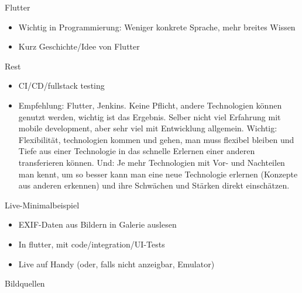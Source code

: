 \documentclass[aspectratio=169,t]{beamer}
\begin{document}
\begin{frame}{Flutter}
 \begin{itemize}
     \item Wichtig in Programmierung: Weniger konkrete Sprache, mehr breites Wissen
     \item Kurz Geschichte/Idee von Flutter
 \end{itemize}
\end{frame}

\begin{frame}{Rest}
 \begin{itemize}
    \item CI/CD/fullstack testing
    \item Empfehlung: Flutter, Jenkins. Keine Pflicht, andere Technologien können genutzt werden, wichtig ist das Ergebnis. Selber nicht viel Erfahrung mit mobile development, aber sehr viel mit Entwicklung allgemein. Wichtig: Flexibilität, technologien kommen und gehen, man muss flexibel bleiben und Tiefe aus einer Technologie in das schnelle Erlernen einer anderen transferieren können. Und: Je mehr Technologien mit Vor- und Nachteilen man kennt, um so besser kann man eine neue Technologie erlernen (Konzepte aus anderen erkennen) und ihre Schwächen und Stärken direkt einschätzen.
 \end{itemize}
\end{frame}

\begin{frame}{Live-Minimalbeispiel}
 \begin{itemize}
     \item EXIF-Daten aus Bildern in Galerie auslesen
     \item In flutter, mit code/integration/UI-Tests
     \item Live auf Handy (oder, falls nicht anzeigbar, Emulator)
 \end{itemize}
\end{frame}


\begin{frame}{Bildquellen}
\printbibliography
\end{frame}
\end{document}
